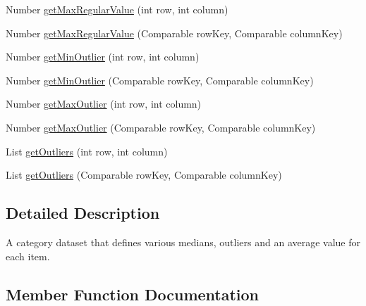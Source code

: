 \begin{DoxyCompactItemize}
\item 
Number \mbox{\hyperlink{interfaceorg_1_1jfree_1_1data_1_1statistics_1_1_box_and_whisker_category_dataset_a4dc17471f39dbde635664e9040f6fd21}{get\+Max\+Regular\+Value}} (int row, int column)
\item 
Number \mbox{\hyperlink{interfaceorg_1_1jfree_1_1data_1_1statistics_1_1_box_and_whisker_category_dataset_ae4cff365d11652710865d02e47b81aba}{get\+Max\+Regular\+Value}} (Comparable row\+Key, Comparable column\+Key)
\item 
Number \mbox{\hyperlink{interfaceorg_1_1jfree_1_1data_1_1statistics_1_1_box_and_whisker_category_dataset_a8a593c6f2cde6255302a043f2460a71e}{get\+Min\+Outlier}} (int row, int column)
\item 
Number \mbox{\hyperlink{interfaceorg_1_1jfree_1_1data_1_1statistics_1_1_box_and_whisker_category_dataset_a8704ec25c8e5e50c44be3d2fd43bc565}{get\+Min\+Outlier}} (Comparable row\+Key, Comparable column\+Key)
\item 
Number \mbox{\hyperlink{interfaceorg_1_1jfree_1_1data_1_1statistics_1_1_box_and_whisker_category_dataset_a768a51eab0c6f619fa19a05c4ef5b59a}{get\+Max\+Outlier}} (int row, int column)
\item 
Number \mbox{\hyperlink{interfaceorg_1_1jfree_1_1data_1_1statistics_1_1_box_and_whisker_category_dataset_a72450d83de5ee798edf42bda87232f1d}{get\+Max\+Outlier}} (Comparable row\+Key, Comparable column\+Key)
\item 
List \mbox{\hyperlink{interfaceorg_1_1jfree_1_1data_1_1statistics_1_1_box_and_whisker_category_dataset_a8daae035046e9f8a98ceda14d3f5d3d5}{get\+Outliers}} (int row, int column)
\item 
List \mbox{\hyperlink{interfaceorg_1_1jfree_1_1data_1_1statistics_1_1_box_and_whisker_category_dataset_a42643c81a2ac6cf5643c87e01b2120c3}{get\+Outliers}} (Comparable row\+Key, Comparable column\+Key)
\end{DoxyCompactItemize}


\subsection{Detailed Description}
A category dataset that defines various medians, outliers and an average value for each item. 

\subsection{Member Function Documentation}
\mbox{\label{interfaceorg_1_1jfree_1_1data_1_1statistics_1_1_box_and_whisker_category_dataset_a768a51eab0c6f619fa19a05c4ef5b59a}} 
